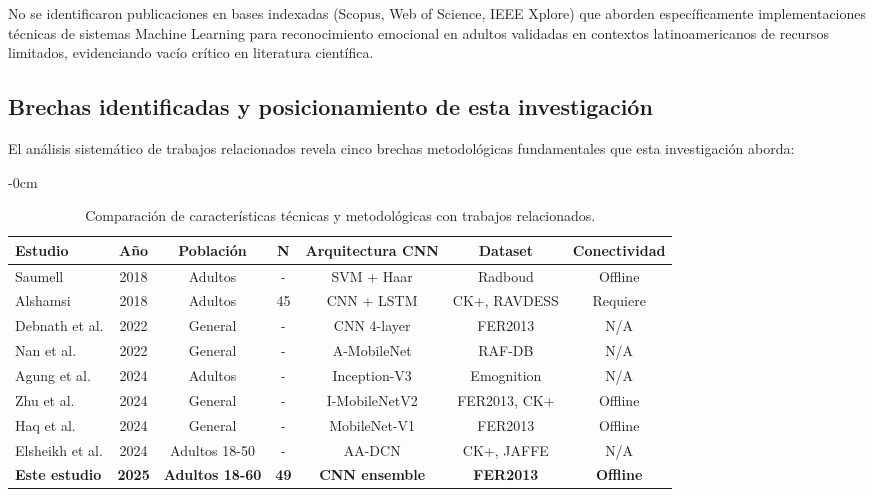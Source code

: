 \documentclass[journal,article,submit,pdftex,moreauthors]{Definitions/mdpi}
\begin{document}
	No se identificaron publicaciones en bases indexadas (Scopus, Web of Science, IEEE Xplore) que aborden específicamente implementaciones técnicas de sistemas Machine Learning para reconocimiento emocional en adultos validadas en contextos latinoamericanos de recursos limitados, evidenciando vacío crítico en literatura científica.
	
	\subsection{Brechas identificadas y posicionamiento de esta investigación}
	
	El análisis sistemático de trabajos relacionados revela cinco brechas metodológicas fundamentales que esta investigación aborda:
	
	\begin{table}[H]
		\caption{Comparación de características técnicas y metodológicas con trabajos relacionados.\label{tab1}}
		\small
		\begin{adjustwidth}{-\extralength}{0cm}
			\begin{tabularx}{\fulllength}{lCCCCCC}
				\toprule
				\textbf{Estudio} & \textbf{Año} & \textbf{Población} & \textbf{N} & \textbf{Arquitectura CNN} & \textbf{Dataset} & \textbf{Conectividad} \\
				\midrule
				Saumell \cite{ref2} & 2018 & Adultos & - & SVM + Haar & Radboud & Offline \\
				Alshamsi \cite{ref1} & 2018 & Adultos & 45 & CNN + LSTM & CK+, RAVDESS & Requiere \\
				Debnath et al. \cite{ref9} & 2022 & General & - & CNN 4-layer & FER2013 & N/A \\
				Nan et al. \cite{ref4} & 2022 & General & - & A-MobileNet & RAF-DB & N/A \\
				Agung et al. \cite{ref7} & 2024 & Adultos & - & Inception-V3 & Emognition & N/A \\
				Zhu et al. \cite{ref3} & 2024 & General & - & I-MobileNetV2 & FER2013, CK+ & Offline \\
				Haq et al. \cite{ref5} & 2024 & General & - & MobileNet-V1 & FER2013 & Offline \\
				Elsheikh et al. \cite{ref8} & 2024 & Adultos 18-50 & - & AA-DCN & CK+, JAFFE & N/A \\
				\textbf{Este estudio} & \textbf{2025} & \textbf{Adultos 18-60} & \textbf{49} & \textbf{CNN ensemble} & \textbf{FER2013} & \textbf{Offline} \\
				\bottomrule
			\end{tabularx}
		\end{adjustwidth}
	\end{table}
\end{document}
